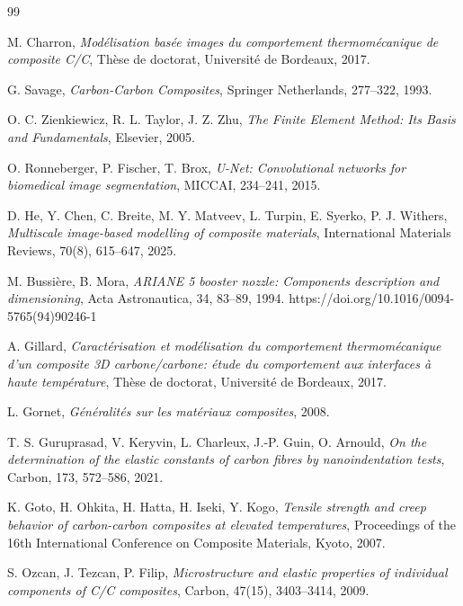 \documentclass[a4paper,11pt]{article}
\begin{document}
\clearpage
{}
\begin{thebibliography}{99}
    
\footnotesize

M. Charron,
\textit{Modélisation basée images du comportement thermomécanique de composite C/C},
Thèse de doctorat, Université de Bordeaux, 2017.

G. Savage,
\textit{Carbon-Carbon Composites}, Springer Netherlands, 277--322, 1993.

O. C. Zienkiewicz, R. L. Taylor, J. Z. Zhu,
\textit{The Finite Element Method: Its Basis and Fundamentals},
Elsevier, 2005.

O. Ronneberger, P. Fischer, T. Brox,
\textit{U-Net: Convolutional networks for biomedical image segmentation},
MICCAI, 234--241, 2015.

D. He, Y. Chen, C. Breite, M. Y. Matveev, L. Turpin, E. Syerko, P. J. Withers,
\textit{Multiscale image-based modelling of composite materials},
International Materials Reviews, 70(8), 615--647, 2025.

M. Bussière, B. Mora,
\textit{ARIANE 5 booster nozzle: Components description and dimensioning},
Acta Astronautica, 34, 83--89, 1994. https://doi.org/10.1016/0094-5765(94)90246-1

A. Gillard,
\textit{Caractérisation et modélisation du comportement thermomécanique d'un composite 3D carbone/carbone: étude du comportement aux interfaces à haute température},
Thèse de doctorat, Université de Bordeaux, 2017.

L. Gornet,
\textit{Généralités sur les matériaux composites},
2008.

T. S. Guruprasad, V. Keryvin, L. Charleux, J.-P. Guin, O. Arnould,
\textit{On the determination of the elastic constants of carbon fibres by nanoindentation tests},
Carbon, 173, 572--586, 2021.

K. Goto, H. Ohkita, H. Hatta, H. Iseki, Y. Kogo,
\textit{Tensile strength and creep behavior of carbon-carbon composites at elevated temperatures},
Proceedings of the 16th International Conference on Composite Materials, Kyoto, 2007.

S. Ozcan, J. Tezcan, P. Filip,
\textit{Microstructure and elastic properties of individual components of C/C composites},
Carbon, 47(15), 3403--3414, 2009.


\end{thebibliography}
\end{document}

